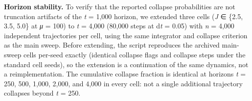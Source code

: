\documentclass[11pt,letterpaper]{article}
\begin{document}
\textbf{Horizon stability.} To verify that the reported collapse probabilities are not truncation artifacts of the \emph{t} = 1,000 horizon, we extended three cells (\emph{J} ∈ \{2.5, 3.5, 5.0\} at \emph{μ} = 100) to \emph{t} = 4,000 (80,000 steps at d\emph{t} = 0.05) with \emph{n} = 4,000 independent trajectories per cell, using the same integrator and collapse criterion as the main sweep. Before extending, the script reproduces the archived main-sweep cells per-seed exactly (identical collapse flags and collapse steps under the standard cell seeds), so the extension is a continuation of the same dynamics, not a reimplementation. The cumulative collapse fraction is identical at horizons \emph{t} = 250, 500, 1,000, 2,000, and 4,000 in every cell: not a single additional trajectory collapses beyond \emph{t} = 250.
\end{document}
